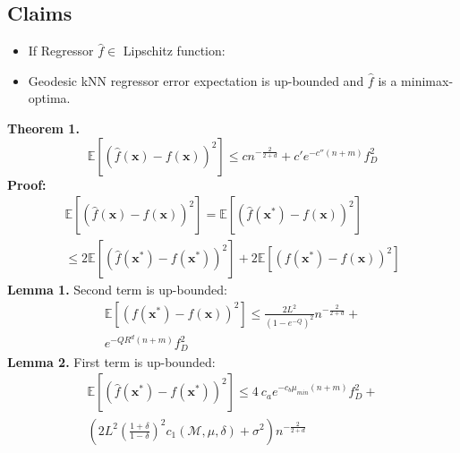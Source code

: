 \documentclass[a0,landscape]{a0poster}
\begin{document}
\begin{multicols}{4}
\section*{Claims}
\begin{itemize}
\item If Regressor $\hat f \in$ Lipschitz function:
\item Geodesic kNN regressor error expectation is up-bounded and $\hat f$ is a minimax-optima.
\end{itemize}
\color{black}
\textbf{Theorem 1.}
\begin{equation*}
\mathbb{E}\left[\left(\hat f(\textbf{x})-f(\textbf{x})\right)^2\right]\leq cn^{-\frac{2}{2+d}} + c'e^{-c''(n+m)}f_D^2
\end{equation*}
\textbf{Proof:}\color{black}
\begin{equation*}
\begin{split}
\mathbb{E}\left[\left(\hat f(\textbf{x})-f(\textbf{x})\right)^2\right] = \mathbb{E}\left[\left(\hat f(\textbf{x}^*)-f(\textbf{x})\right)^2\right] \\
\leq 2\mathbb{E}\left[\left(\hat f(\textbf{x}^*)-f(\textbf{x}^*)\right)^2\right]+2\mathbb{E}\left[\left(f(\textbf{x}^*)-f(\textbf{x})\right)^2\right]
\end{split}
\end{equation*}
\textbf{Lemma 1.} Second term is up-bounded:
\begin{equation*}
\begin{split}
    \mathbb{E}\left[\left(f(\textbf{x}^*)-f(\textbf{x})\right)^2\right] \leq \frac{2L^2}{(1-e^{-Q})^2}n^{-\frac{2}{2+d}} +\\ e^{-QR^d(n+m)}f_D^2
\end{split}
\end{equation*}
\textbf{Lemma 2.} First term is up-bounded:
\begin{equation*}
\begin{split}
    \mathbb{E}\left[\left(\hat f(\textbf{x}^*)-f(\textbf{x}^*)\right)^2\right] \leq 4~c_ae^{-c_b\mu_{min}(n+m)}f_D^2 +\\ \left(2L^2\left(\frac{1+\delta}{1-\delta}\right)^2c_1(\mathcal{M},\mu,\delta)+\sigma^2\right)n^{-\frac{2}{2+d}}
\end{split}
\end{equation*}

\color{Navy}

\end{multicols}
\end{document}
